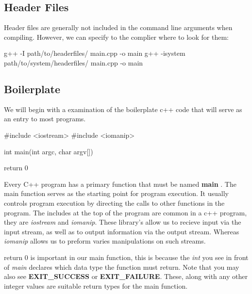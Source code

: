 \documentclass{report}
\begin{document}
    \bigbreak \noindent 
    \subsection{Header Files}
    Header files are generally not included in the command line arguments when compiling. However, we can specify to the complier where to look for them:
    \bigbreak \noindent 
    
    \begin{cppcode}
g++ -I path/to/headerfiles/ main.cpp -o main
g++ -isystem path/to/system/headerfiles/ main.cpp -o main
    \end{cppcode}
    



    \pagebreak
    \markboth{}{}
    \bigbreak \noindent 
    \subsection{Boilerplate}
    \bigbreak \noindent 
    We will begin with a examination of the boilerplate c++ code that will serve as an entry to most programs.
    
    \begin{cppcode}
#include <iostream>
#include <iomanip>

int main(int argc, char argv[]){

    return 0
}
    \end{cppcode}
    
    \bigbreak \noindent 
    Every C++ program has a primary function that must be named \textbf{main} . The main function serves as the starting point for program execution. It usually controls program execution by directing the calls to other functions in the program.
    \bigbreak \noindent 
    The includes at the top of the program are common in a c++ program, they are \textit{iostream} and \textit{iomanip}. These library's allow us to recieve input via the input stream, as well as to output information  via the output stream. Whereas \textit{iomanip} allows us to preform varies manipulations on such streams.
    \bigbreak \noindent 
    \begin{notebox}
        return 0 is important in our main function, this is because the \textit{int} you see in front of \textit{main} declares which data type the function must return. Note that you may also see \textbf{EXIT\_SUCCESS} or \textbf{EXIT\_FAILURE}. These, along with any other integer values are suitable return types for the main function.
    \end{notebox}
\end{document}

